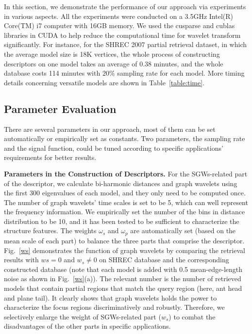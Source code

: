 In this section, we demonstrate the performance of our approach via
experiments in various aspects. All the experiments were conducted on
a 3.5GHz Intel(R) Core(TM) i7 computer with 16GB memory. We used the
cusparse and cublas libraries in CUDA to help reduce the computational
time for wavelet transform significantly. For instance, for the SHREC
2007 partial retrieval dataset, in which the average model size is 18K
vertices, the whole process of constructing descriptors on one model
takes an average of 0.38 minutes, and the whole database costs 114
minutes with $20\%$ sampling rate for each model. More timing details
concerning versatile models are shown in Table~\ref{table:time}.

\subsection{Parameter Evaluation}

There are several parameters in our approach, most of them can be set
automatically or empirically set as constants. Two parameters, the
sampling rate and the signal function, could be tuned according to
specific applications' requirements for better results.

\textbf{Parameters in the Construction of Descriptors.} For the
SGWs-related part of the descriptor, we calculate bi-harmonic
distances and graph wavelets using the first 300 eigenvalues of each
model, and they only need to be computed once. The number of graph
wavelets' time scales is set to be 5, which can well represent the
frequency information. We empirically set the number of the bins in
distance distribution to be 10, and it has been tested to be
sufficient to characterize the structure features. The weights
$\omega_s$ and $\omega_p$ are automatically set (based on the mean
scale of each part) to balance the three parts that comprise the
descriptor. Fig.~\ref{ws} demonstrates the function of graph
wavelets by comparing the retrieval results with $ws = 0$ and
$w_s \neq 0$ on SHREC database and the corresponding constructed
database (note that each model is added with 0.5 mean-edge-length
noise as shown in Fig.~\ref{ws}(a)). The relevant number is the
number of retrieved models that contain partial regions that match
the query region (here, ant head and plane tail). It clearly shows
that graph wavelets holds the power to characterize the focus regions
discriminatively and robustly. Therefore, we selectively enlarge the
weight of SGWs-related part ($w_s$) to combat the disadvantages of
the other parts in specific applications.

